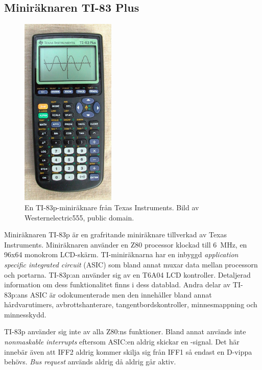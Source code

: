 \documentclass[main.tex]{subfiles}
\begin{document}
\newpage
\subsection{Miniräknaren TI-83 Plus}

\begin{figure}
    \centering
    \includegraphics[width=0.4\textwidth, bb=0 0 284 578]{img/ti83p.jpg}
    \caption{En TI-83p-miniräknare från Texas Instruments. Bild av
    Westernelectric555, public domain.}
    \label{fig:ti83p}
\end{figure}

Miniräknaren TI-83p är en grafritande miniräknare tillverkad av Texas
Instruments. Miniräknaren använder en Z80 processor klockad till
\SI{6}{\mega\hertz}, en 96x64 monokrom LCD-skärm. TI-miniräknarna har en
inbyggd {\it application specific integrated circuit} (ASIC) som bland annat
muxar data mellan processorn och portarna. TI-83p:an använder sig av en T6A04
LCD kontroller. Detaljerad information om dess funktionalitet finns i dess
datablad\cite{t6a04}. Andra delar av TI-83p:ans ASIC är odokumenterade men den
innehåller bland annat hårdvarutimers, avbrottshanterare,
tangentbordskontroller, minnesmappning och minnesskydd.

TI-83p använder sig inte av alla Z80:ns funktioner. Bland annat används inte
{\it nonmaskable interrupts} eftersom ASIC:en aldrig skickar en
-signal. Det här innebär även att IFF2 aldrig kommer skilja sig från
IFF1 så endast en D-vippa behövs. {\it Bus request} används aldrig då
 aldrig går aktiv.
\end{document}

